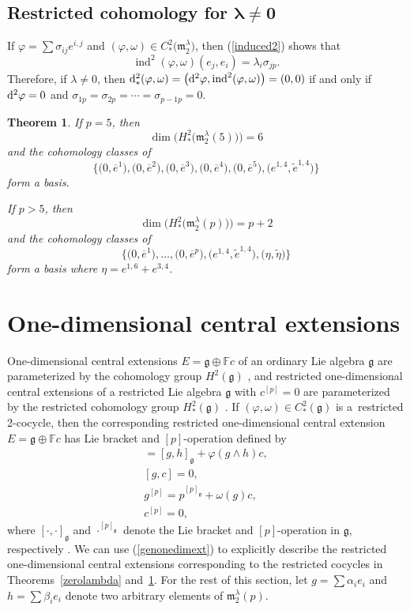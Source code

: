 \documentclass[10pt,a4paper]{amsart}
\def\ind{\operatorname{ind}}
\def\phi{\varphi}
\def\g{\mathfrak g}
\def\m{\mathfrak m}
\def\F{\mathbb F}
\numberwithin{equation}{section}
\newtheorem{Theorem}{Theorem}[section]
\begin{document}
\subsection[Restricted cohomology for $\lambda\ne 0$]{Restricted cohomology for $\boldsymbol{\lambda\ne 0}$}\label{section4.3}

If $\phi=\sum\sigma_{ij}e^{i,j}$ and $(\phi,\omega)\in C^2_*\big(\m_2^\lambda\big)$, then (\ref{induced2}) shows that
\[\ind^2(\phi,\omega)(e_j,e_i)=\lambda_i\sigma_{jp}.\]
Therefore, if $\lambda\ne 0$, then
${\rm d}^2_*(\phi,\omega)=\big({\rm d}^2\phi,\ind^2(\phi,\omega)\big)=(0,0)$ if and only
if ${\rm d}^2\phi=0$ and $\sigma_{1p}=\sigma_{2p}=\cdots = \sigma_{p-1 p}=0$.


\begin{Theorem}\label{nonzerolambda}
 If $p=5$, then
 \[\dim\big(H^2_*\big(\m_2^\lambda(5)\big)\big)=6\] and the cohomology
 classes of
 \[\big\{\big(0,\overline e^1\big), \big(0,\overline e^2\big),\big(0,\overline
 e^3\big),\big(0,\overline e^4\big), \big(0,\overline e^5\big), \big( e^{1,4},\tilde
 e^{1,4}\big)\big\}\] form a basis.

 If $p>5$, then
 \[\dim\big(H^2_*\big(\m_2^\lambda(p)\big)\big)=p+2\] and the cohomology
 classes of
 \[\big\{\big(0,\overline e^1\big),\dots, \big(0,\overline e^p\big),\big( e^{1,4},\tilde
 e^{1,4}\big),\big(\eta,\tilde \eta\big)\big\}\] form a basis where $\eta=e^{1,6}+e^{3,4} $.
\end{Theorem}

\section{One-dimensional central extensions}\label{section5}

One-dimensional central extensions $E=\g\oplus\F c$ of an ordinary Lie algebra $\g$ are parameterized by the cohomology group $H^2(\g)$ \cite[Chapter~1, Section~4.6]{FuchsBook}, and restricted one-dimensional central extensions of a restricted Lie algebra $\g$ with $c^{[p]}=0$ are parameterized by the restricted cohomology group $H^2_*(\g)$
\cite[Theorem~3.3]{Hochschild1954}. If $(\phi,\omega)\in C^2_*(\g)$ is a~restricted 2-cocycle, then the corresponding restricted one-dimensional central extension $E=\g\oplus\F c$ has Lie bracket and $[p]$-operation defined by
\begin{gather}
 [g,h] =[g,h]_{\g}+\phi(g\wedge h) c,\nonumber\\
 [g, c] = 0,\nonumber\\
 g^{[p]} = p^{[p]_{\g}}+\omega(g) c,\nonumber\\
 c^{[p]} = 0,\label{genonedimext}
\end{gather}
where $[\cdot,\cdot]_\g$ and $\cdot^{[p]_\g}$ denote the Lie bracket and $[p]$-operation in $\g$, respectively \cite[equations~(26) and~(27)]{EvansFuchs2008}. We can use (\ref{genonedimext}) to explicitly describe the restricted one-dimensional central extensions corresponding to the restricted cocycles in Theorems~\ref{zerolambda} and~\ref{nonzerolambda}. For the rest of this section, let $g=\sum \alpha_ie_i$ and $h=\sum\beta_ie_i$ denote two arbitrary elements of $\m_2^\lambda(p)$.
\end{document}
